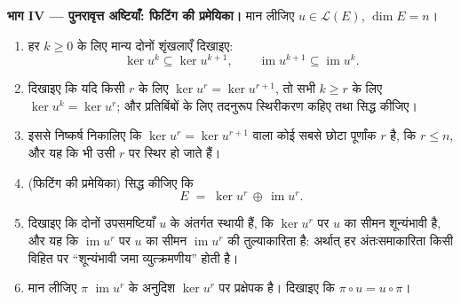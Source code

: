 \begin{problem}
\medskip \noindent\textbf{भाग IV --- पुनरावृत्त अष्टियाँ: फिटिंग की
प्रमेयिका।} मान लीजिए $u \in \mathcal{L}(E)$, $\dim E = n$।
\begin{enumerate}[resume]
  \item हर $k \geq 0$ के लिए मान्य दोनों शृंखलाएँ दिखाइए:
        \[
        \ker u^k \subseteq \ker u^{k+1},
        \qquad
        \operatorname{im} u^{k+1} \subseteq \operatorname{im}
        u^k .
        \]
  \item दिखाइए कि यदि किसी $r$ के लिए $\ker u^{r} = \ker u^{r+1}$, तो सभी $k
  \geq r$ के लिए $\ker u^{k} = \ker u^{r}$; और प्रतिबिंबों के लिए तदनुरूप
  स्थिरीकरण कहिए तथा सिद्ध कीजिए।
  \item इससे निष्कर्ष निकालिए कि $\ker u^{r} = \ker u^{r+1}$ वाला कोई सबसे
  छोटा पूर्णांक $r$ है, कि $r \leq n$, और यह कि  भी उसी $r$ पर
  स्थिर हो जाते हैं।
  \item (फिटिंग की प्रमेयिका) सिद्ध कीजिए कि
        \[
        E \;=\; \ker u^{r} \,\oplus\, \operatorname{im} u^{r} .
        \]
  \item दिखाइए कि दोनों उपसमष्टियाँ $u$ के अंतर्गत स्थायी हैं, कि $\ker
  u^{r}$ पर $u$ का सीमन शून्यंभावी है, और यह कि $\operatorname{im} u^{r}$ पर
  $u$ का सीमन $\operatorname{im} u^{r}$ की तुल्याकारिता है: अर्थात् हर
  अंतःसमाकारिता किसी विहित  पर ``शून्यंभावी जमा व्युत्क्रमणीय''
  होती है।
  \item मान लीजिए $\pi$ $\operatorname{im} u^{r}$ के अनुदिश $\ker u^{r}$ पर
  प्रक्षेपक है। दिखाइए कि $\pi \circ u = u \circ \pi$।
\end{enumerate}


\end{problem}
